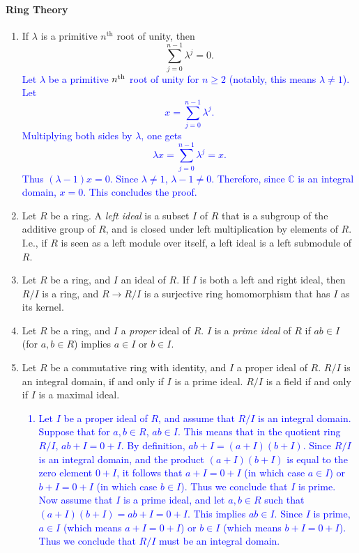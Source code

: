 \documentclass{article}
\newcommand{\expl}[1]{\textcolor{blue}{#1}}
\begin{document}
	\paragraph{Ring Theory}
	\begin{enumerate}[resume = algebra]
		\item If $\lambda$ is a primitive $n^{\text{th}}$ root of unity, then 
		\begin{equation*}
			\sum_{j = 0}^{n - 1}\lambda^{j} = 0. 
		\end{equation*}
		\expl{Let $\lambda$ be a primitive $n\textsuperscript{th}$ root of unity for $n \geq 2$ (notably, this means $\lambda \neq 1$). Let $$x = \sum_{j = 0}^{n - 1}\lambda^{j}.$$ Multiplying both sides by $\lambda$, one gets $$\lambda x = \sum_{j = 0}^{n - 1}\lambda^{j} = x.$$ Thus $(\lambda -1)x = 0$. Since $\lambda \neq 1$, $\lambda -1 \neq 0$. Therefore, since $\mathbb{C}$ is an integral domain, $x = 0$. This concludes the proof. }
		\item Let $R$ be a ring. A \textit{left ideal} is a subset $I$ of $R$ that is a subgroup of the additive group of $R$, and is closed under left multiplication by elements of $R$. I.e., if $R$ is seen as a left module over itself, a left ideal is a left submodule of $R$. 
		\item Let $R$ be a ring, and $I$ an ideal of $R$. If $I$ is both a left and right ideal, then $R/I$ is a ring, and $R \to R/I$ is a surjective ring homomorphism that has $I$ as its kernel. 
		\item Let $R$ be a ring, and $I$ a \textit{proper} ideal of $R$. $I$ is a \textit{prime ideal} of $R$ if $ab \in I$ (for $a, b \in R$) implies $a \in I$ or $b \in I$. 
		\item Let $R$ be a commutative ring with identity, and $I$ a proper ideal of $R$. $R/I$ is an integral domain, if and only if $I$ is a prime ideal. $R/I$ is a field if and only if $I$ is a maximal ideal. \newline \vspace{-0.65cm}
		\expl{
			\begin{enumerate}[itemsep =-2pt,label = \arabic{*}.]
				\item Let $I$ be a proper ideal of $R$, and assume that $R/I$ is an integral domain. Suppose that for $a, b \in R$, $ab \in I$. This means that in the quotient ring $R/I$, $ab + I = 0 + I$. By definition, $ab + I = (a + I)(b + I)$. Since $R/I$ is an integral domain, and the product $(a + I)(b + I)$ is equal to the zero element $0 + I$, it follows that $a + I = 0 + I$ (in which case $a \in I$) or $b + I = 0 + I$ (in which case $b \in I$). Thus we conclude that $I$ is prime. Now assume that $I$ is a prime ideal, and let $a, b \in R$ such that $(a + I)(b + I) = ab + I = 0 + I$. This implies $ab \in I$. Since $I$ is prime, $a \in I$ (which means $a + I = 0 + I$) or $b \in I$ (which means $b + I = 0 + I$). Thus we conclude that $R/I$ must be an integral domain. 

\end{enumerate}}
\end{enumerate}
\end{document}
